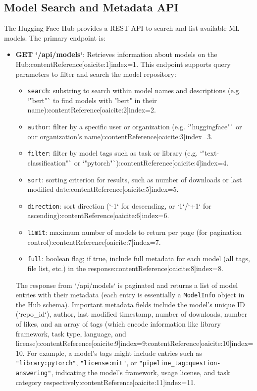 \documentclass{article}
\begin{document}
\subsection{Model Search and Metadata API}
The Hugging Face Hub provides a REST API to search and list available ML models. The primary endpoint is:
\begin{itemize}
    \item \textbf{GET `/api/models`}: Retrieves information about models on the Hub:contentReference[oaicite:1]{index=1}. This endpoint supports query parameters to filter and search the model repository:
    \begin{itemize}
        \item \texttt{search}: substring to search within model names and descriptions (e.g. `"bert"` to find models with "bert" in their name):contentReference[oaicite:2]{index=2}.
        \item \texttt{author}: filter by a specific user or organization (e.g. `"huggingface"` or our organization’s name):contentReference[oaicite:3]{index=3}.
        \item \texttt{filter}: filter by model tags such as task or library (e.g. `"text-classification"` or `"pytorch"`):contentReference[oaicite:4]{index=4}.
        \item \texttt{sort}: sorting criterion for results, such as number of downloads or last modified date:contentReference[oaicite:5]{index=5}.
        \item \texttt{direction}: sort direction (`-1` for descending, or `1`/`+1` for ascending):contentReference[oaicite:6]{index=6}.
        \item \texttt{limit}: maximum number of models to return per page (for pagination control):contentReference[oaicite:7]{index=7}.
        \item \texttt{full}: boolean flag; if true, include full metadata for each model (all tags, file list, etc.) in the response:contentReference[oaicite:8]{index=8}.
    \end{itemize}
    The response from `/api/models` is paginated and returns a list of model entries with their metadata (each entry is essentially a \texttt{ModelInfo} object in the Hub schema). Important metadata fields include the model’s unique ID (`repo_id`), author, last modified timestamp, number of downloads, number of likes, and an array of tags (which encode information like library framework, task type, language, and license):contentReference[oaicite:9]{index=9}:contentReference[oaicite:10]{index=10}. For example, a model’s tags might include entries such as \texttt{"library:pytorch"}, \texttt{"license:mit"}, or \texttt{"pipeline\_tag:question-answering"}, indicating the model’s framework, usage license, and task category respectively:contentReference[oaicite:11]{index=11}.

\end{itemize}
\end{document}

